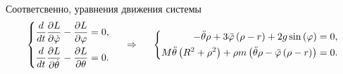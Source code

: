 Соответсвенно, уравнения движения системы
\begin{equation}
    \left\{\begin{aligned}
        \frac{d }{d t} \frac{\partial L}{\partial \dot{\varphi}} - \frac{\partial L}{\partial \varphi} &= 0, \\
        \frac{d }{d t} \frac{\partial L}{\partial \dot{\theta}} - \frac{\partial L}{\partial \theta} &= 0.
    \end{aligned}\right.
    \hspace{0.5cm} \Rightarrow \hspace{0.5cm} 
    \left\{\begin{aligned}
    - \ddot{\theta} \rho + 3 \ddot{\varphi} \left(\rho - r\right) + 2 g \sin{\left(\varphi \right)} &= 0, \\
    M \ddot{\theta} \left(R^{2} + \rho^{2}\right) + \rho m \left(\ddot{\theta} \rho - \ddot{\varphi} \left(\rho - r\right)\right) &= 0.
    \end{aligned}\right.
\end{equation}